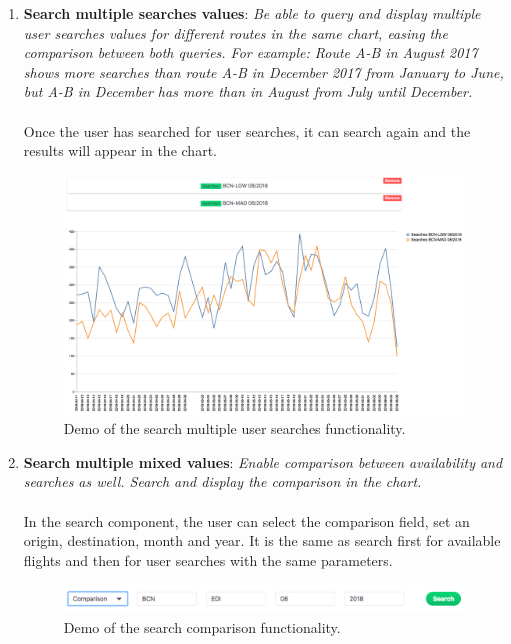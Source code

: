 \begin{enumerate}
    \item \textbf{Search multiple searches values}: \textit{Be able to query and display multiple user searches values for different routes in the same chart, easing the comparison between both queries. For example: Route A-B in August 2017 shows more searches than route A-B in December 2017 from January to June, but A-B in December has more than in August from July until December.}
    \\\\
    Once the user has searched for user searches, it can search again and the results will appear in the chart.
    \begin{figure}[H]
    \centering
    \includegraphics[scale=0.3]{resources/search-multiple-searches.png}
    \caption{Demo of the search multiple user searches functionality.}
    \end{figure}

    \item \textbf{Search multiple mixed values}: \textit{Enable comparison between availability and searches as well. Search and display the comparison in the chart.}
    \\\\
    In the search component, the user can select the comparison field, set an origin, destination, month and year. It is the same as search first for available flights and then for user searches with the same parameters.
    \begin{figure}[H]
    \centering
    \includegraphics[scale=0.35]{resources/search-comparison.png}
    \caption{Demo of the search comparison functionality.}
    \end{figure}


\end{enumerate}
